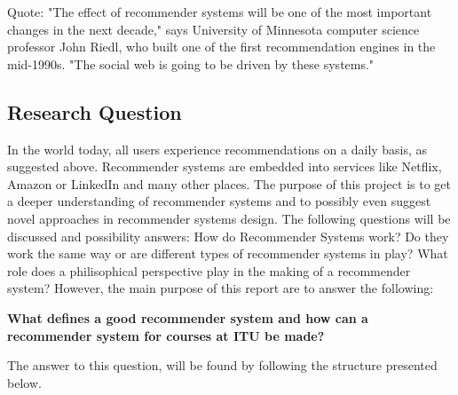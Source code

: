 
Quote:
"The effect of recommender systems will be one of the most important changes in the next decade," says University of Minnesota computer science professor John Riedl, who built one of the first recommendation engines in the mid-1990s. "The social web is going to be driven by these systems."

\newpage

\subsection*{Research Question}
In the world today, all users experience recommendations on a daily basis, as suggested above. Recommender systems are embedded into services like Netflix, Amazon or LinkedIn and many other places. \newline
The purpose of this project is to get a deeper understanding of recommender systems and to possibly even suggest novel approaches in recommender systems design.\newline
The following questions will be discussed and possibility answers: How do Recommender Systems work? Do they work the same way or are different types of recommender systems in play? What role does a philisophical perspective play in the making of a recommender system? However, the main purpose of this report are to answer the following: \newline

\textbf{What defines a good recommender system and how can a recommender system for courses at ITU be made?}\newline

The answer to this question, will be found by following the structure presented below.

